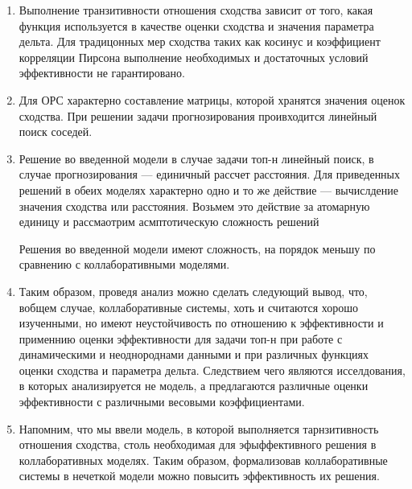 \documentclass[a4paper,14pt]{proc}
\begin{document}
{\begin{enumerate}
\item Выполнение транзитивности отношения сходства зависит от того, какая функция используется в качестве оценки сходства и значения параметра дельта. 
Для традицонных мер сходства таких как косинус и коэффициент корреляции Пирсона выполнение необходимых и достаточных условий эффективности
не гарантировано.



\item Для ОРС характерно составление матрицы, которой хранятся значения оценок сходства.
При решении задачи прогнозирования проивходится линейный поиск соседей. 

\item Решение во введенной модели в случае задачи топ-н линейный поиск, в случае прогнозирования --- единичный рассчет расстояния.
Для приведенных решений в обеих моделях характерно одно и то же действие --- вычислдение значения сходства или расстояния. Возьмем
это действие за атомарную единицу и рассмаотрим асмптотическую сложность решений

Решения во введенной модели имеют сложность, на порядок меньшу по сравнению с коллаборативными моделями.

\item Таким образом, проведя анализ можно сделать следующий вывод, что, вобщем случае, коллаборативные системы,
хоть и считаются хорошо изученными, но имеют неустойчивость по отношению к эффективности и применнию оценки эффективности 
для задачи топ-н при работе с динамическими и неоднороднами данными и при различных функциях оценки сходства и параметра дельта.
Следствием чего являются исселдования, в которых анализируется не модель, а предлагаются различные оценки эффективности с различными 
весовыми коэффициентами.

\item Напомним, что мы ввели модель, в которой выполняется тарнзитивность отношения сходства, столь необходимая для эфыффективного
решения в коллаборативных моделях. Таким образом, формализовав коллаборативные системы в нечеткой модели можно повысить эффективность их решения.


\end{enumerate}}
\end{document}
